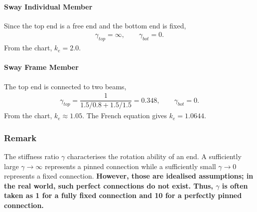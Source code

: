 \paragraph{Sway Individual Member}
Since the top end is a free end and the bottom end is fixed,
\begin{gather*}
\gamma_{top}=\infty,\qquad\gamma_{bot}=0.
\end{gather*}
From the chart, $k_e=2.0$.
\begin{figure}[H]
\centering

\end{figure}
\paragraph{Sway Frame Member}
The top end is connected to two beams,
\begin{gather*}
\gamma_{top}=\dfrac{1}{1.5/0.8+1.5/1.5}=0.348,\qquad
\gamma_{bot}=0.
\end{gather*}
From the chart, $k_e\approx1.05$.
The French equation gives $k_e=1.0644$.
\begin{figure}[H]
\centering

\end{figure}
\subsubsection{Remark}
The stiffness ratio $\gamma$ characterises the rotation ability of an end.
A sufficiently large $\gamma\rightarrow\infty$ represents a pinned connection while a sufficiently small $\gamma\rightarrow0$ represents a fixed connection.
\textbf{However, those are idealised assumptions; in the real world, such perfect connections do not exist.
Thus, $\gamma$ is often taken as \num{1} for a fully fixed connection and \num{10} for a perfectly pinned connection.}

